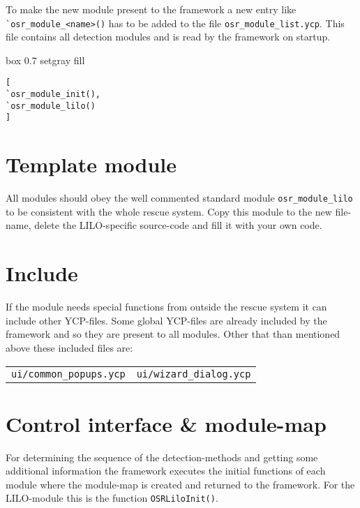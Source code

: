 To make the new module present to the framework a new
entry like \verb+`osr_module_<name>()+ has to be added to the file
\verb+osr_module_list.ycp+. This file contains all detection modules and
is read by the framework on startup.

\begin{program}[h!]
\begin{boxitpara}{box 0.7 setgray fill}
{\footnotesize \begin{verbatim}
[
`osr_module_init(),
`osr_module_lilo()
]
\end{verbatim}}
\end{boxitpara}
\caption{Contents of the file {\tt osr\_module\_list.ycp} so far}
\end{program}

\section{Template module}
All modules should obey the well commented standard module
\verb+osr_module_lilo+ to be consistent with the whole rescue system.
Copy this module to the new file-name, delete the LILO-specific
source-code and fill it with your own code.

\section{Include}
If the module needs special functions from outside the rescue system it
can include other YCP-files. Some global YCP-files are already included
by the framework and so they are present to all modules. Other that than
mentioned above these included files are:\\

\begin{tabular}{p{5cm}p{5cm}}
\verb+ui/common_popups.ycp+ & \verb+ui/wizard_dialog.ycp+\\
\end{tabular}

\section{Control interface \& module-map}
For determining the sequence of the detection-methods and getting some
additional information the framework executes the initial functions of
each module where the module-map is created and returned to the framework.
For the LILO-module this is the function \verb+OSRLiloInit()+.\\

